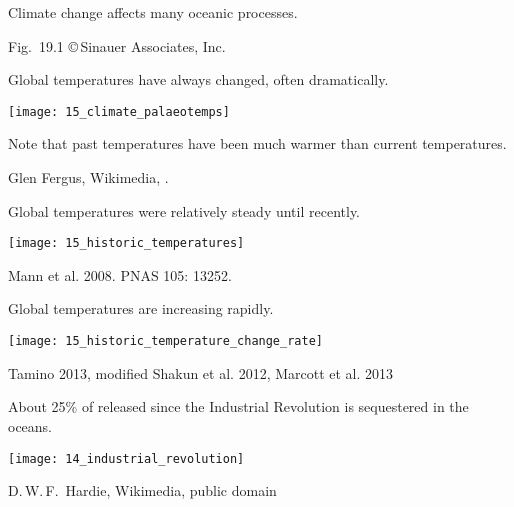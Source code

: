 \documentclass[t]{beamer}
\begin{document}

{
\begin{frame}[b]{Climate change affects many oceanic processes.}

	\tiny Fig.~19.1 \copyright\,Sinauer Associates, Inc.
\end{frame}
}
%

\begin{frame}{Global temperatures have always changed, often dramatically.}

	{\centering
		\texttt{[image: 15\_climate\_palaeotemps]}\par
	}
	
	\bigskip
	
	Note that past temperatures have been much warmer than current temperatures.
	
	\vfilll
	
	\hfill \tiny Glen Fergus, Wikimedia, .  

\end{frame}

\begin{frame}[t]{Global temperatures were relatively steady until recently.}

	{\centering
		\texttt{[image: 15\_historic\_temperatures]}\par
	}
	
	\vfilll
	
	\hfill \tiny Mann et al. 2008. PNAS 105: 13252.  
	
\end{frame}
%
\begin{frame}[t]{Global temperatures are increasing rapidly.}

	\texttt{[image: 15\_historic\_temperature\_change\_rate]}

	\vfilll
	
	\hfill \tiny Tamino 2013, modified Shakun et al. 2012, Marcott et al. 2013

\end{frame}
%

\begin{frame}{About 25\% of  released since the Industrial Revolution is sequestered in the oceans.}

	\texttt{[image: 14\_industrial\_revolution]}
	
	\vfilll 
	
	\hfill \tiny D.\,W.\,F.~Hardie, Wikimedia, public domain
	
\end{frame}
%
\end{document}
